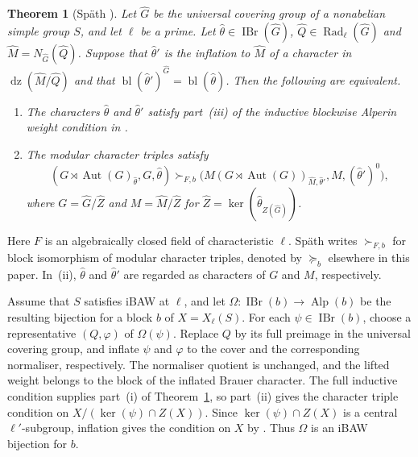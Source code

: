 \documentclass[10pt]{amsart}
\newtheorem{theorem}{Theorem}[section]
\theoremstyle{definition}
\DeclareMathOperator{\Aut}{Aut}
\DeclareMathOperator{\IBr}{IBr}
\DeclareMathOperator{\Alp}{Alp}
\DeclareMathOperator{\Rad}{Rad}
\DeclareMathOperator{\dz}{dz}
\DeclareMathOperator{\bl}{bl}
\numberwithin{equation}{section}
\numberwithin{table}{section}
\begin{document}
\begin{theorem}[Sp\"ath {\cite[Theorem~4.4]{Spath2017Triples}}]\label{thm:spath-triples}
Let $\widehat G$ be the universal covering group of a nonabelian simple
group $S$, and let $\ell$ be a prime.  Let
$\widehat\theta\in\IBr(\widehat G)$,
$\widehat Q\in\Rad_\ell(\widehat G)$ and
$\widehat M=N_{\widehat G}(\widehat Q)$.  Suppose that
$\widehat\theta'$ is the inflation to $\widehat M$ of a character in
$\dz(\widehat M/\widehat Q)$ and that
$\bl(\widehat\theta')^{\widehat G}=\bl(\widehat\theta)$.
Then the following are equivalent.
\begin{enumerate}[label=\textup{(\roman*)}]
\item The characters $\widehat\theta$ and $\widehat\theta'$ satisfy
part~\textup{(iii)} of the inductive blockwise Alperin weight condition
in \cite[Definition~4.1]{Spath2013}.
\item The modular character triples satisfy
\begin{equation}\label{eq:spath-block-triples}
 (G\rtimes\Aut(G)_{\widehat\theta},G,\widehat\theta)
 \succ_{F,b}
 \bigl(M(G\rtimes\Aut(G))_{\widehat M,\widehat\theta'},
       M,(\widehat\theta')^0\bigr),
\end{equation}
where $G=\widehat G/\widehat Z$ and $M=\widehat M/\widehat Z$ for
$\widehat Z=\ker(\widehat\theta_{Z(\widehat G)})$.
\end{enumerate}
\end{theorem}

Here $F$ is an algebraically closed field of characteristic $\ell$.
Sp\"ath writes $\succ_{F,b}$ for block isomorphism of modular character
triples, denoted by $\succeq_b$ elsewhere in this paper. In~\textup{(ii)},
$\widehat\theta$ and $\widehat\theta'$ are regarded as characters of $G$
and $M$, respectively.

Assume that $S$ satisfies iBAW at $\ell$, and let
$\Omega:\IBr(b)\to\Alp(b)$ be the resulting bijection for a block $b$
of $X=X_\ell(S)$. For each $\psi\in\IBr(b)$, choose a representative
$(Q,\varphi)$ of $\Omega(\psi)$. Replace $Q$ by its full preimage in
the universal covering group, and inflate $\psi$ and $\varphi$ to the
cover and the corresponding normaliser, respectively. The normaliser
quotient is unchanged, and the lifted weight belongs to the block of the
inflated Brauer character. The full inductive condition
supplies part~\textup{(i)} of Theorem~\ref{thm:spath-triples}, so
part~\textup{(ii)} gives the character triple condition on
$X/(\ker(\psi)\cap Z(X))$.
Since $\ker(\psi)\cap Z(X)$ is a central $\ell'$-subgroup, inflation gives
the condition on $X$ by \cite[Remark~4.4]{BroughSpath2022}. Thus $\Omega$ is an iBAW
bijection for $b$.
\end{document}

